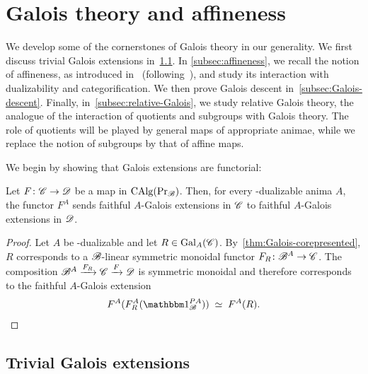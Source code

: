 \documentclass[english,svgnames,table]{article}
\begin{document}
\section{Galois theory and affineness}
\label{sec:affine-galois-theory}
We develop some of the cornerstones of Galois theory in our generality. 
We first discuss trivial Galois extensions in~\cref{subsec:trivial-extensions}. 
In \cref{subsec:affineness}, we recall the notion of affineness, as introduced in~\cite{BCSY-Fourier} (following~\cite{Gaitsgory-2015-1-affineness,Mathew-Meier-2015-affineness}), and study its interaction with dualizability and categorification. 
We then prove Galois descent in~\cref{subsec:Galois-descent}. 
Finally, in~\cref{subsec:relative-Galois}, we study relative Galois theory, the analogue of the interaction of quotients and subgroups with Galois theory.
The role of quotients will be played by general maps of appropriate animae, while we replace the notion of subgroups by that of affine maps.

We begin by showing that Galois extensions are functorial:
\begin{proposition}
\label{cor:Galois-preserved-under-symmetric-monoidal}
    Let $F\colon \mathscr{C} \to \mathscr{D}$ be a map in $\operatorname{CAlg}(\operatorname{Pr}_{\mathscr{B}})$. Then, for every \COB-dualizable anima $A$, the functor $F^A$ sends faithful $A$-Galois extensions in $\mathscr{C}$ to faithful $A$-Galois extensions in $\mathscr{D}$.
\end{proposition}

\begin{proof}
    Let $A$ be \COB-dualizable and let $R\in \mathrm{Gal}_A(\mathscr{C})$. By~\cref{thm:Galois-corepresented}, $R$ corresponds to a $\mathscr{B}$-linear symmetric monoidal functor $F_R\colon \mathscr{B}^A \to \mathscr{C}$. The composition $\mathscr{B}^A \xrightarrow[]{F_R} \mathscr{C} \xrightarrow[]{F} \mathscr{D}$ is symmetric monoidal and therefore corresponds to the faithful $A$-Galois extension
    \begin{equation*}
        F^A(F_R^A(\ounit_{\basecat}^{\Path A})) \;\simeq\; F^A(R).
    \end{equation*}
\end{proof}

\subsection{Trivial Galois extensions}
\label{subsec:trivial-extensions}
\end{document}
